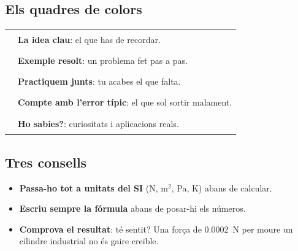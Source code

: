 \subsection*{Els quadres de colors}
\begin{center}
\renewcommand{\arraystretch}{1.3}
\begin{tabular}{@{}ll@{}}
\textcolor{blau}{\rule{1.2em}{1.2em}} & \textbf{La idea clau}: el que has de recordar.\\
\textcolor{verd}{\rule{1.2em}{1.2em}} & \textbf{Exemple resolt}: un problema fet pas a pas.\\
\textcolor{taronja}{\rule{1.2em}{1.2em}} & \textbf{Practiquem junts}: tu acabes el que falta.\\
\textcolor{vermell}{\rule{1.2em}{1.2em}} & \textbf{Compte amb l'error típic}: el que sol sortir malament.\\
\textcolor{aire}{\rule{1.2em}{1.2em}} & \textbf{Ho sabies?}: curiositats i aplicacions reals.
\end{tabular}
\end{center}

\subsection*{Tres consells}
\begin{itemize}
 \item \textbf{Passa-ho tot a unitats del SI} (N, m$^2$, Pa, K) abans de calcular.
 \item \textbf{Escriu sempre la fórmula} abans de posar-hi els números.
 \item \textbf{Comprova el resultat}: té sentit? Una força de \SI{0,0002}{N} per moure un cilindre industrial no és gaire creïble.
\end{itemize}
